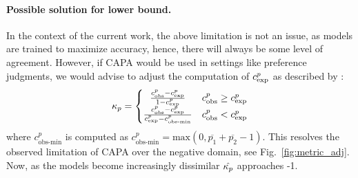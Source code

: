 \paragraph{Possible solution for lower bound.} In the context of the current work, the above limitation is not an issue, as models are trained to maximize accuracy, hence, there will always be some level of agreement. However, if CAPA would be used in settings like preference judgments, we would advise to adjust the computation of $c_{\text{exp}}^{p}$ as described by \citet{safak2020min}:
\begin{align}
    \kappa_{p} = \left\{\begin{matrix}
                    \frac{c_{\text{obs}}^{p} - c_{\text{exp}}^{p}}{1 - c_{\text{exp}}^{p}} & c_{\text{obs}}^{p} \geq c_{\text{exp}}^{p}  \\
                    \frac{c_{\text{obs}}^{p} - c_{\text{exp}}^{p}}{c_{\text{exp}}^{p} - c_{\text{obs-min}}^{p}} & c_{\text{obs}}^{p} < c_{\text{exp}}^{p} \\
                \end{matrix}\right.
    \label{eq:k_p_adj}
\end{align}
where $c_{\text{obs-min}}^{p}$ is computed as $c_{\text{obs-min}}^{p} = \text{max}(0, \overline{p_1}+\overline{p_2}-1)$. This resolves the observed limitation of CAPA over the negative domain, see Fig.~\ref{fig:metric_adj}. Now, as the models become increasingly dissimilar $\hat{\kappa_{p}}$ approaches -1. 